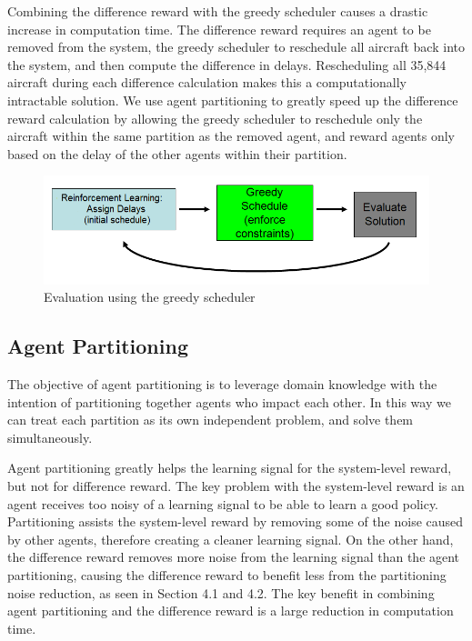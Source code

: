 \documentclass{aamas2014}
\begin{document}
Combining the difference reward with the greedy scheduler causes a drastic increase in computation time. The difference reward requires an agent to be removed from the system, the greedy scheduler to reschedule all aircraft back into the system, and then compute the difference in delays. Rescheduling all 35,844 aircraft during each difference calculation makes this a computationally intractable solution. We use agent partitioning to greatly speed up the difference reward calculation by allowing the greedy scheduler to reschedule only the aircraft within the same partition as the removed agent, and reward agents only based on the delay of the other agents within their partition.

\begin{figure}[]
\centering
\includegraphics[width=1.0\columnwidth]{LearningCycle}
\caption{Evaluation using the greedy scheduler}
\label{LearningCycle}
\end{figure}

\subsection{Agent Partitioning}

The objective of agent partitioning is to leverage domain knowledge with the intention of partitioning together agents who impact each other. In this way we can treat each partition as its own independent problem, and solve them simultaneously.

Agent partitioning greatly helps the learning signal for the system-level reward, but not for difference reward. The key problem with the system-level reward is an agent receives too noisy of a learning signal to be able to learn a good policy. Partitioning assists the system-level reward by removing some of the noise caused by other agents, therefore creating a cleaner learning signal. On the other hand, the difference reward removes more noise from the learning signal than the agent partitioning, causing the difference reward to benefit less from the partitioning noise reduction, as seen in Section 4.1 and 4.2. The key benefit in combining agent partitioning and the difference reward is a large reduction in computation time. 
\end{document}
